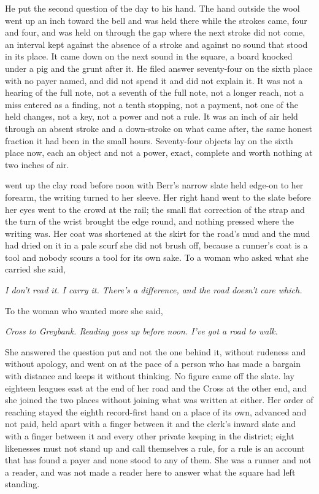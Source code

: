 He put the second question of the day to his hand. The hand outside the wool went up an inch toward the bell and was held there while the strokes came, four and four, and was held on through the gap where the next stroke did not come, an interval kept against the absence of a stroke and against no sound that stood in its place. It came down on the next sound in the square, a board knocked under a pig and the grunt after it. He filed answer seventy-four on the sixth place with no payer named, and did not spend it and did not explain it. It was not a hearing of the full note, not a seventh of the full note, not a longer reach, not a miss entered as a finding, not a tenth stopping, not a payment, not one of the held changes, not a key, not a power and not a rule. It was an inch of air held through an absent stroke and a down-stroke on what came after, the same honest fraction it had been in the small hours. Seventy-four objects lay on the sixth place now, each an object and not a power, exact, complete and worth nothing at two inches of air.

 went up the clay road before noon with Berr's narrow slate held edge-on to her forearm, the writing turned to her sleeve. Her right hand went to the slate before her eyes went to the crowd at the rail; the small flat correction of the strap and the turn of the wrist brought the edge round, and nothing pressed where the writing was. Her coat was shortened at the skirt for the road's mud and the mud had dried on it in a pale scurf she did not brush off, because a runner's coat is a tool and nobody scours a tool for its own sake. To a woman who asked what she carried she said,

\emph{I don't read it. I carry it. There's a difference, and the road doesn't care which.}

To the woman who wanted more she said,

\emph{Cross to Greybank. Reading goes up before noon. I've got a road to walk.}

She answered the question put and not the one behind it, without rudeness and without apology, and went on at the pace of a person who has made a bargain with distance and keeps it without thinking. No figure came off the slate.  lay eighteen leagues east at the end of her road and the Cross at the other end, and she joined the two places without joining what was written at either. Her order of reaching stayed the eighth record-first hand on a place of its own, advanced and not paid, held apart with a finger between it and the clerk's inward slate and with a finger between it and every other private keeping in the district; eight likenesses must not stand up and call themselves a rule, for a rule is an account that has found a payer and none stood to any of them. She was a runner and not a reader, and was not made a reader here to answer what the square had left standing.

